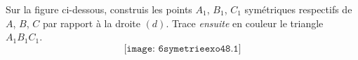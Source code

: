 Sur la figure ci-dessous, construis les points $A_1$, $B_1$, $C_1$
symétriques respectifs de $A$, $B$, $C$ par rapport à la droite $(d)$.
Trace {\em ensuite} en couleur le triangle $A_1B_1C_1$.
\[\texttt{[image: 6symetrieexo48.1]}\]